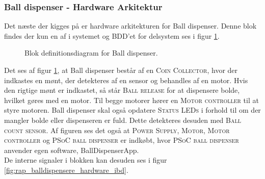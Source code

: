 \documentclass[Rapport/Rapport_main.tex]{subfiles}
\begin{document}
\subsubsection{Ball dispenser - Hardware Arkitektur}
Det næste der kigges på er hardware arkitekturen for Ball dispenser. Denne blok findes der kun en af i systemet og BDD'et for delsystem ses i figur \ref{fig:rap_balldispenser_hardware_bdd}.
\begin{figure}[H]
    \centering
    \caption{Blok definitionsdiagram for Ball dispenser.}
    \label{fig:rap_balldispenser_hardware_bdd}
\end{figure}
Det ses af figur \ref{fig:rap_balldispenser_hardware_bdd}, at Ball dispenser består af en \textsc{Coin Collector}, hvor der indkastes en mønt, der detekteres af en sensor og behandles af en motor. Hvis den rigtige mønt er indkastet, så står \textsc{Ball release} for at dispensere bolde, hvilket gøres med en motor. Til begge motorer hører en \textsc{Motor controller} til at styre motoren. Ball dispenser skal også opdatere \textsc{Status LEDs} i forhold til om der mangler bolde eller dispenseren er fuld. Dette detekteres desuden med \textsc{Ball count sensor}. Af figuren ses det også at \textsc{Power Supply}, \textsc{Motor}, \textsc{Motor controller} og \textsc{PSoC ball dispenser} er indkøbt, hvor \textsc{PSoC ball dispenser} anvender egen software, BallDispenserApp.\\
De interne signaler i blokken kan desuden ses i figur \ref{fig:rap_balldispensere_hardware_ibd}.
\end{document}
